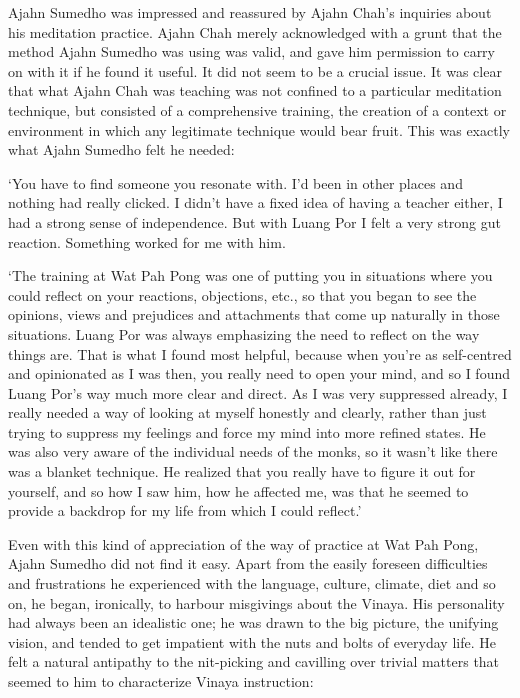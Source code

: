 Ajahn Sumedho was impressed and reassured by Ajahn Chah's inquiries
about his meditation practice. Ajahn Chah merely acknowledged with a
grunt that the method Ajahn Sumedho was using was valid, and gave him
permission to carry on with it if he found it useful. It did not seem to
be a crucial issue. It was clear that what Ajahn Chah was teaching was
not confined to a particular meditation technique, but consisted of a
comprehensive training, the creation of a context or environment in
which any legitimate technique would bear fruit. This was exactly what
Ajahn Sumedho felt he needed:

`You have to find someone you resonate with. I'd been in other places
and nothing had really clicked. I didn't have a fixed idea of having a
teacher either, I had a strong sense of independence. But with Luang Por
I felt a very strong gut reaction. Something worked for me with him.

`The training at Wat Pah Pong was one of putting you in situations where
you could reflect on your reactions, objections, etc., so that you began
to see the opinions, views and prejudices and attachments that come up
naturally in those situations. Luang Por was always emphasizing the need
to reflect on the way things are. That is what I found most helpful,
because when you're as self-centred and opinionated as I was then, you
really need to open your mind, and so I found Luang Por's way much more
clear and direct. As I was very suppressed already, I really needed a
way of looking at myself honestly and clearly, rather than just trying
to suppress my feelings and force my mind into more refined states. He
was also very aware of the individual needs of the monks, so it wasn't
like there was a blanket technique. He realized that you really have to
figure it out for yourself, and so how I saw him, how he affected me,
was that he seemed to provide a backdrop for my life from which I could
reflect.'

Even with this kind of appreciation of the way of practice at Wat Pah
Pong, Ajahn Sumedho did not find it easy. Apart from the easily foreseen
difficulties and frustrations he experienced with the language, culture,
climate, diet and so on, he began, ironically, to harbour misgivings
about the Vinaya. His personality had always been an idealistic one; he
was drawn to the big picture, the unifying vision, and tended to get
impatient with the nuts and bolts of everyday life. He felt a natural
antipathy to the nit-picking and cavilling over trivial matters that
seemed to him to characterize Vinaya instruction:

